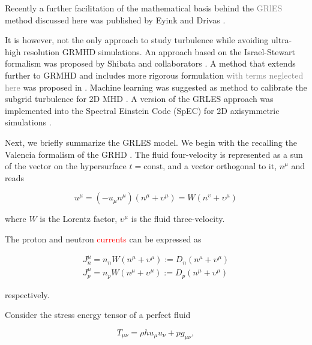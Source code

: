 \documentclass[11pt,a4paper,headinclude=true,DIV=14,BCOR=8mm,chapterprefix,listof=totoc,twoside,openright,abstracton]{scrbook}
\newcommand{\red}[1]{\textcolor{red}{#1}}
\newcommand{\gray}[1]{\textcolor{gray}{#1}}
\begin{document}
Recently a further facilitation of the mathematical basis behind the \gray{GRlES} method discussed here was published by Eyink and Drivas \cite{Eyink:2017zfz}.

It is however, not the only approach to study turbulence while avoiding ultra-high resolution GRMHD simulations. An approach based on the Israel-Stewart formalism was proposed by Shibata and collaborators \cite{Shibata:2017jyf}.
A method that extends further to GRMHD and includes more rigorous formulation \gray{with terms neglected here} was proposed in \cite{Carrasco:2019uzl,Vigano:2020ouc}. 
Machine learning was suggested as method to calibrate the subgrid turbulence for 2D MHD \cite{Rosofsky:2020}. 
A version of the GRLES approach was implemented into the Spectral Einstein Code (SpEC) for 2D axisymmetric simulations \cite{Jesse:2020oss}.


Next, we briefly summarize the GRLES model. We begin with the recalling the Valencia formalism of the GRHD \cite{Banyuls:1997}. The fluid four-velocity is represented as a sun of the vector on the hypersurface $t=\text{const}$, and a vector orthogonal to it, $n^{\mu}$ and reads

\begin{equation}
    u^{\mu} = (-u_{\mu}n^{\mu})(n^{\mu}+\upsilon^{\mu}) = W(n^{\upsilon} + \upsilon^{\mu})
\end{equation}

where $W$ is the Lorentz factor, $\upsilon^{\mu}$ is the fluid three-velocity.

The proton and neutron \red{currents} can be expressed as

\begin{eqnarray}
    J^{\mu}_n = n_n W(n^{\mu} + \upsilon^{\mu}) := D_n (n^{\mu} + \upsilon^{\mu}) \\
    J^{\mu}_p = n_p W(n^{\mu} + \upsilon^{\mu}) := D_p (n^{\mu} + \upsilon^{\mu})
\end{eqnarray}

respectively.



Consider the stress energy tensor of a perfect fluid

\begin{equation}
    T_{\mu\nu} = \rho h u_{\mu} u_{\nu} + pg_{\mu\nu},
\end{equation}
\end{document}
